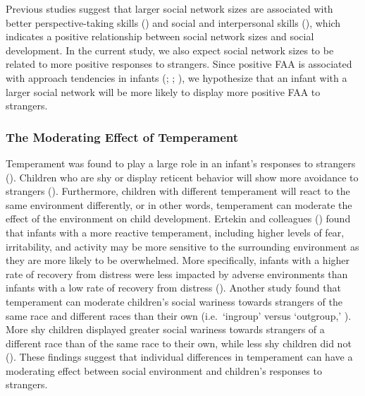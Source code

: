 \documentclass[
  man,
  floatsintext,
  longtable,
  nolmodern,
  notxfonts,
  notimes,
  colorlinks=true,linkcolor=blue,citecolor=blue,urlcolor=blue]{apa7}
\begin{document}
Previous studies suggest that larger social network sizes are associated
with better perspective-taking skills
() and
social and interpersonal skills
(),
which indicates a positive relationship between social network sizes and
social development. In the current study, we also expect social network
sizes to be related to more positive responses to strangers. Since
positive FAA is associated with approach tendencies in infants
(;
;
),
we hypothesize that an infant with a larger social network will be more
likely to display more positive FAA to strangers.

\subsubsection{The Moderating Effect of
Temperament}\label{the-moderating-effect-of-temperament}

Temperament was found to play a large role in an infant's responses to
strangers (). Children who are shy or display reticent behavior will show
more avoidance to strangers
().
Furthermore, children with different temperament will react to the same
environment differently, or in other words, temperament can moderate the
effect of the environment on child development. Ertekin and colleagues
() found that
infants with a more reactive temperament, including higher levels of
fear, irritability, and activity may be more sensitive to the
surrounding environment as they are more likely to be overwhelmed. More
specifically, infants with a higher rate of recovery from distress were
less impacted by adverse environments than infants with a low rate of
recovery from distress
(). Another study found that temperament can moderate children's
social wariness towards strangers of the same race and different races
than their own (i.e.~`ingroup' versus `outgroup,'
).
More shy children displayed greater social wariness towards strangers of
a different race than of the same race to their own, while less shy
children did not (). These findings suggest that individual differences in
temperament can have a moderating effect between social environment and
children's responses to strangers.
\end{document}
